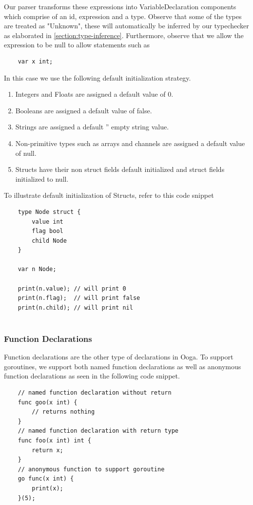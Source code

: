 \documentclass{report}
\begin{document}
Our parser transforms these expressions into VariableDeclaration components which comprise of an id, expression and a type. Observe that some of the types are treated as "Unknown", these will automatically be inferred by our typechecker as elaborated in \ref{section:type-inference}. Furthermore, observe that we allow the expression to be null to allow statements such as 

\begin{verbatim} 
    var x int; 
\end{verbatim}

In this case we use the following default initialization strategy.

\begin{enumerate}
    \item Integers and Floats are assigned a default value of 0.
    \item Booleans are assigned a default value of false.
    \item Strings are assigned a default '' empty string value.
    \item Non-primitive types such as arrays and channels are assigned a default value of null.
    \item Structs have their non struct fields default initialized and struct fields initialized to null.
\end{enumerate}

To illustrate default initialization of Structs, refer to this code snippet

\begin{verbatim}
    type Node struct {
        value int
        flag bool
        child Node
    }
    
    var n Node;
    
    print(n.value); // will print 0
    print(n.flag);  // will print false
    print(n.child); // will print nil
    
\end{verbatim}

\subsubsection{Function Declarations}

Function declarations are the other type of declarations in Ooga. To support goroutines, we support both named function declarations as well as anonymous function declarations as seen in the following code snippet.

\begin{verbatim}
    // named function declaration without return
    func goo(x int) {
        // returns nothing
    }
    // named function declaration with return type
    func foo(x int) int { 
        return x;
    }
    // anonymous function to support goroutine
    go func(x int) { 
        print(x);
    }(5);
    
\end{verbatim}
\end{document}
